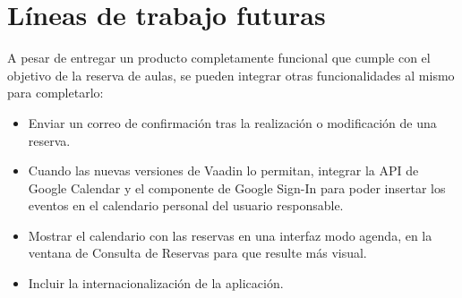 \section{Líneas de trabajo futuras}
A pesar de entregar un producto completamente funcional que cumple con el objetivo de la reserva de aulas, se pueden integrar otras funcionalidades al mismo para completarlo:

\begin{itemize}
    \item Enviar un correo de confirmación tras la realización o modificación de una reserva.
    \item Cuando las nuevas versiones de Vaadin lo permitan, integrar la API de Google Calendar y el componente de Google Sign-In para poder insertar los eventos en el calendario personal del usuario responsable.
    \item Mostrar el calendario con las reservas en una interfaz modo agenda, en la ventana de Consulta de Reservas para que resulte más visual.
    \item Incluir la internacionalización de la aplicación.
\end{itemize}